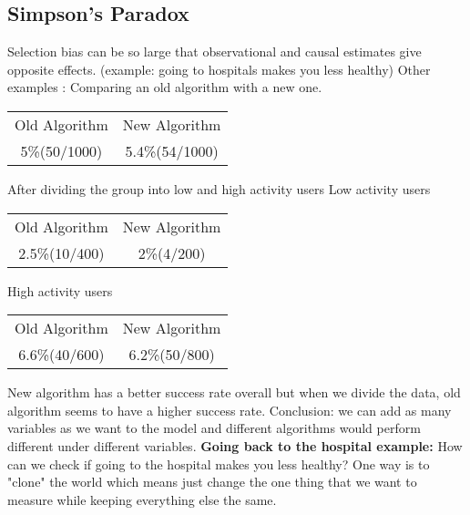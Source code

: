 \subsection{Simpson's Paradox}
Selection bias can be so large that observational and causal estimates give opposite effects. \newline
(example: going to hospitals makes you less healthy) \newline
Other examples : Comparing an old algorithm with a new one. \newline

\begin{tabular}{c c}
Old Algorithm & New Algorithm  \\
5\%(50/1000) & 5.4\%(54/1000) \newline
\end{tabular} \newline \newline
After dividing the group into low and high activity users \newline
Low activity users \newline
\begin{tabular}{c c}
Old Algorithm & New Algorithm  \\
2.5\%(10/400) & 2\%(4/200) \newline
\end{tabular} \newline \newline
High activity users \newline
\begin{tabular}{c c}
Old Algorithm & New Algorithm  \\
6.6\%(40/600) & 6.2\%(50/800)
\end{tabular} \newline \newline
New algorithm has a better success rate overall but when we divide the data, old algorithm seems to have a higher success rate. \newline
Conclusion: we can add as many variables as we want to the model and different algorithms would perform different under different variables. \newline \newline
\textbf{Going back to the hospital example:} \newline
How can we check if going to the hospital makes you less healthy? \newline
One way is to "clone" the world which means just change the one thing that we want to measure while keeping everything else the same. \newline
